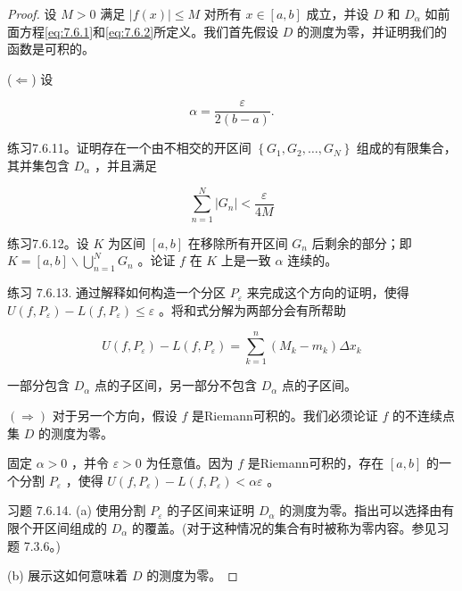 \begin{proof}
  设 \(M > 0\) 满足 \(\left| {f\left( x\right) }\right|  \leq  M\) 对所有 \(x \in  \left\lbrack  {a,b}\right\rbrack\) 成立，并设 \(D\) 和 \({D}_{\alpha }\) 如前面方程\ref{eq:7.6.1}和\ref{eq:7.6.2}所定义。我们首先假设 \(D\) 的测度为零，并证明我们的函数是可积的。

($\Leftarrow$) 设

\[
\alpha  = \frac{\varepsilon }{2\left( {b - a}\right) }.
\]

练习7.6.11。证明存在一个由不相交的开区间 \(\left\{  {{G}_{1},{G}_{2},\ldots ,{G}_{N}}\right\}\) 组成的有限集合，其并集包含 \({D}_{\alpha }\) ，并且满足

\[
\mathop{\sum }\limits_{{n = 1}}^{N}\left| {G}_{n}\right|  < \frac{\varepsilon }{4M}
\]

练习7.6.12。设 \(K\) 为区间 \(\left\lbrack  {a,b}\right\rbrack\) 在移除所有开区间 \({G}_{n}\) 后剩余的部分；即 \(K = \left\lbrack  {a,b}\right\rbrack   \smallsetminus  \mathop{\bigcup }\limits_{{n = 1}}^{N}{G}_{n}\) 。论证 \(f\) 在 \(K\) 上是一致 \(\alpha\) 连续的。

练习 7.6.13. 通过解释如何构造一个分区 \({P}_{\varepsilon }\) 来完成这个方向的证明，使得 \(U\left( {f,{P}_{\varepsilon }}\right)  - L\left( {f,{P}_{\varepsilon }}\right)  \leq  \varepsilon\) 。将和式分解为两部分会有所帮助

\[
U\left( {f,{P}_{\varepsilon }}\right)  - L\left( {f,{P}_{\varepsilon }}\right)  = \mathop{\sum }\limits_{{k = 1}}^{n}\left( {{M}_{k} - {m}_{k}}\right) \Delta {x}_{k}
\]

一部分包含 \({D}_{\alpha }\) 点的子区间，另一部分不包含 \({D}_{\alpha }\) 点的子区间。

\(\left(  \Rightarrow  \right)\) 对于另一个方向，假设 \(f\) 是Riemann可积的。我们必须论证 \(f\) 的不连续点集 \(D\) 的测度为零。

固定 \(\alpha  > 0\) ，并令 \(\varepsilon  > 0\) 为任意值。因为 \(f\) 是Riemann可积的，存在 \(\left\lbrack  {a,b}\right\rbrack\) 的一个分割 \({P}_{\varepsilon }\) ，使得 \(U\left( {f,{P}_{\varepsilon }}\right)  - L\left( {f,{P}_{\varepsilon }}\right)  < {\alpha \varepsilon }\) 。

习题 7.6.14. (a) 使用分割 \({P}_{\varepsilon }\) 的子区间来证明 \({D}_{\alpha }\) 的测度为零。指出可以选择由有限个开区间组成的 \({D}_{\alpha }\) 的覆盖。(对于这种情况的集合有时被称为零内容。参见习题 7.3.6。)

(b) 展示这如何意味着 \(D\) 的测度为零。
\end{proof}


